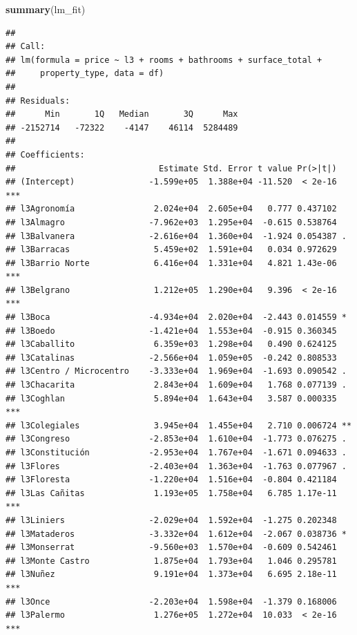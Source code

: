 \documentclass[]{book}
\newenvironment{Shaded}{\begin{snugshade}}{\end{snugshade}}
\newcommand{\KeywordTok}[1]{\textcolor[rgb]{0.13,0.29,0.53}{\textbf{#1}}}
\newcommand{\NormalTok}[1]{#1}
\begin{document}
\begin{Shaded}
\begin{Highlighting}[]
\KeywordTok{summary}\NormalTok{(lm_fit)}
\end{Highlighting}
\end{Shaded}

\begin{verbatim}
## 
## Call:
## lm(formula = price ~ l3 + rooms + bathrooms + surface_total + 
##     property_type, data = df)
## 
## Residuals:
##      Min       1Q   Median       3Q      Max 
## -2152714   -72322    -4147    46114  5284489 
## 
## Coefficients:
##                             Estimate Std. Error t value Pr(>|t|)    
## (Intercept)               -1.599e+05  1.388e+04 -11.520  < 2e-16 ***
## l3Agronomía                2.024e+04  2.605e+04   0.777 0.437102    
## l3Almagro                 -7.962e+03  1.295e+04  -0.615 0.538764    
## l3Balvanera               -2.616e+04  1.360e+04  -1.924 0.054387 .  
## l3Barracas                 5.459e+02  1.591e+04   0.034 0.972629    
## l3Barrio Norte             6.416e+04  1.331e+04   4.821 1.43e-06 ***
## l3Belgrano                 1.212e+05  1.290e+04   9.396  < 2e-16 ***
## l3Boca                    -4.934e+04  2.020e+04  -2.443 0.014559 *  
## l3Boedo                   -1.421e+04  1.553e+04  -0.915 0.360345    
## l3Caballito                6.359e+03  1.298e+04   0.490 0.624125    
## l3Catalinas               -2.566e+04  1.059e+05  -0.242 0.808533    
## l3Centro / Microcentro    -3.333e+04  1.969e+04  -1.693 0.090542 .  
## l3Chacarita                2.843e+04  1.609e+04   1.768 0.077139 .  
## l3Coghlan                  5.894e+04  1.643e+04   3.587 0.000335 ***
## l3Colegiales               3.945e+04  1.455e+04   2.710 0.006724 ** 
## l3Congreso                -2.853e+04  1.610e+04  -1.773 0.076275 .  
## l3Constitución            -2.953e+04  1.767e+04  -1.671 0.094633 .  
## l3Flores                  -2.403e+04  1.363e+04  -1.763 0.077967 .  
## l3Floresta                -1.220e+04  1.516e+04  -0.804 0.421184    
## l3Las Cañitas              1.193e+05  1.758e+04   6.785 1.17e-11 ***
## l3Liniers                 -2.029e+04  1.592e+04  -1.275 0.202348    
## l3Mataderos               -3.332e+04  1.612e+04  -2.067 0.038736 *  
## l3Monserrat               -9.560e+03  1.570e+04  -0.609 0.542461    
## l3Monte Castro             1.875e+04  1.793e+04   1.046 0.295781    
## l3Nuñez                    9.191e+04  1.373e+04   6.695 2.18e-11 ***
## l3Once                    -2.203e+04  1.598e+04  -1.379 0.168006    
## l3Palermo                  1.276e+05  1.272e+04  10.033  < 2e-16 ***

\end{verbatim}
\end{document}
